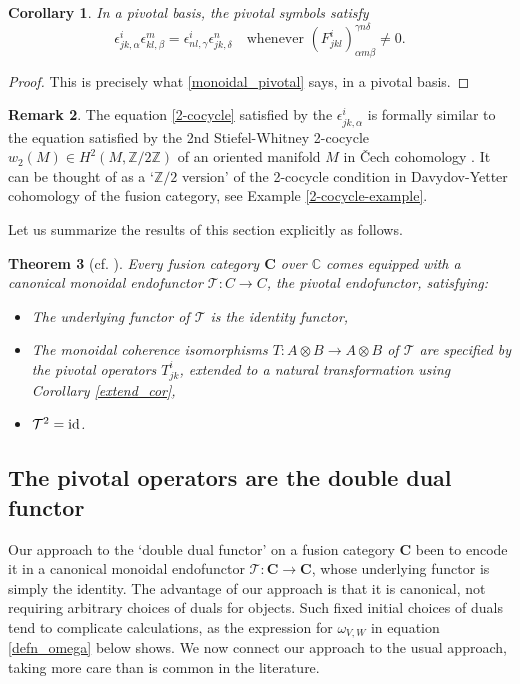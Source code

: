 \documentclass[a4paper]{article}
\theoremstyle{plain}
\newtheorem{thm}{Theorem}[section]
\newtheorem{cor}[thm]{Corollary}
\theoremstyle{definition}
\newtheorem{rem}[thm]{Remark}
\newcommand\id{\operatorname{\text{\rm id}}}
\newcommand{\cat}{\mathbf}
\begin{document}
\begin{cor} In a pivotal basis, the pivotal symbols satisfy
\begin{equation} \label{2-cocycle} 
 \epsilon^i_{jk, \alpha} \epsilon^m_{kl, \beta} = \epsilon^i_{nl, \gamma} \epsilon^n_{jk, \delta} \quad \text{whenever } (F^i_{jkl})^{\gamma n \delta}_{\alpha m \beta} \neq 0.
\end{equation}
\end{cor}

\begin{proof}
This is precisely what \eqref{monoidal_pivotal} says, in a pivotal basis.
\end{proof}
\begin{rem} The equation \eqref{2-cocycle} satisfied by the $\epsilon^i_{jk, \alpha}$ is formally similar to the equation satisfied by the 2nd Stiefel-Whitney 2-cocycle $w_2(M) \in H^2(M, \mathbb{Z}/2\mathbb{Z})$ of an oriented manifold $M$ in \v{C}ech cohomology \cite{naber-2011}. It can be thought of as a `$\mathbb{Z}/2$ version' of the 2-cocycle condition in Davydov-Yetter cohomology of the fusion category, see Example \ref{2-cocycle-example}. \label{remark_2_cocycle}
\end{rem}

Let us summarize the results of this section explicitly as follows.

\begin{thm}[{cf. \cite[Thm 2.6]{eno02-ofc}}] Every fusion category $\cat{C}$ over $\mathbb{C}$ comes equipped with a canonical monoidal endofunctor $\mathcal{T} : C \rightarrow C$, the pivotal endofunctor, satisfying:
\begin{itemize}
 \item The underlying functor of $\mathcal{T}$ is the identity functor,
 \item The monoidal coherence isomorphisms $T : A \otimes B \rightarrow A \otimes B$ of $\mathcal{T}$ are specified by the pivotal operators $T^i_{jk}$, extended to a natural transformation using Corollary \ref{extend_cor},
 \item $\mathcal{T}^2 = \id$. 
\end{itemize}
 \label{piv_operator_C}
\end{thm}









\subsection{The pivotal operators are the double dual functor} \label{pivops}
Our approach to the `double dual functor' on a fusion category $\cat{C}$ been to encode it in a canonical monoidal endofunctor $\mathcal{T} : \cat{C} \rightarrow \cat{C}$, whose underlying functor is simply the identity. The advantage of our approach is that it is canonical, not requiring arbitrary choices of duals for objects. Such fixed initial choices of duals tend to complicate calculations, as the expression for $\omega_{V,W}$ in equation \eqref{defn_omega} below shows.  We now connect our approach to the usual approach, taking more care than is common in the literature. 
\end{document}
